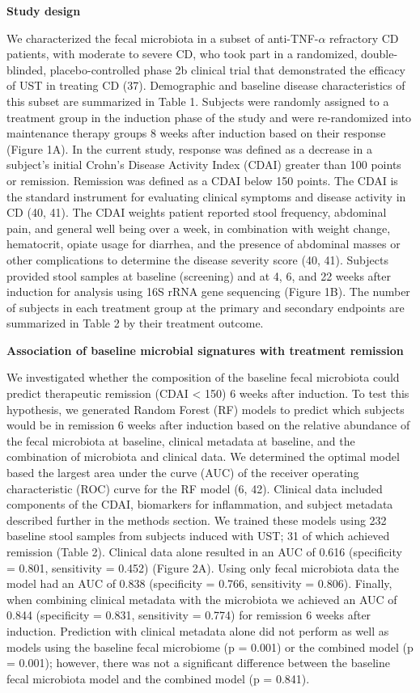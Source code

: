 \documentclass[12pt,]{article}
\begin{document}
\textbf{Study design}

We characterized the fecal microbiota in a subset of
anti-TNF-\({\alpha}\) refractory CD patients, with moderate to severe
CD, who took part in a randomized, double-blinded, placebo-controlled
phase 2b clinical trial that demonstrated the efficacy of UST in
treating CD (37). Demographic and baseline disease characteristics of
this subset are summarized in Table 1. Subjects were randomly assigned
to a treatment group in the induction phase of the study and were
re-randomized into maintenance therapy groups 8 weeks after induction
based on their response (Figure 1A). In the current study, response was
defined as a decrease in a subject's initial Crohn's Disease Activity
Index (CDAI) greater than 100 points or remission. Remission was defined
as a CDAI below 150 points. The CDAI is the standard instrument for
evaluating clinical symptoms and disease activity in CD (40, 41). The
CDAI weights patient reported stool frequency, abdominal pain, and
general well being over a week, in combination with weight change,
hematocrit, opiate usage for diarrhea, and the presence of abdominal
masses or other complications to determine the disease severity score
(40, 41). Subjects provided stool samples at baseline (screening) and at
4, 6, and 22 weeks after induction for analysis using 16S rRNA gene
sequencing (Figure 1B). The number of subjects in each treatment group
at the primary and secondary endpoints are summarized in Table 2 by
their treatment outcome.

\textbf{Association of baseline microbial signatures with treatment
remission}

We investigated whether the composition of the baseline fecal microbiota
could predict therapeutic remission (CDAI \textless{} 150) 6 weeks after
induction. To test this hypothesis, we generated Random Forest (RF)
models to predict which subjects would be in remission 6 weeks after
induction based on the relative abundance of the fecal microbiota at
baseline, clinical metadata at baseline, and the combination of
microbiota and clinical data. We determined the optimal model based the
largest area under the curve (AUC) of the receiver operating
characteristic (ROC) curve for the RF model (6, 42). Clinical data
included components of the CDAI, biomarkers for inflammation, and
subject metadata described further in the methods section. We trained
these models using 232 baseline stool samples from subjects induced with
UST; 31 of which achieved remission (Table 2). Clinical data alone
resulted in an AUC of 0.616 (specificity = 0.801, sensitivity = 0.452)
(Figure 2A). Using only fecal microbiota data the model had an AUC of
0.838 (specificity = 0.766, sensitivity = 0.806). Finally, when
combining clinical metadata with the microbiota we achieved an AUC of
0.844 (specificity = 0.831, sensitivity = 0.774) for remission 6 weeks
after induction. Prediction with clinical metadata alone did not perform
as well as models using the baseline fecal microbiome (p = 0.001) or the
combined model (p = 0.001); however, there was not a significant
difference between the baseline fecal microbiota model and the combined
model (p = 0.841).
\end{document}
